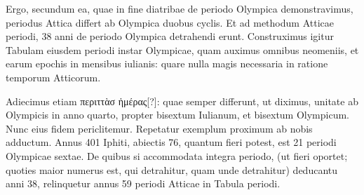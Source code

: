 Ergo, secundum ea, quae in fine diatribae de periodo
Olympica demonstravimus, periodus Attica differt ab Olympica
duobus cyclis.
Et ad methodum Atticae periodi, 38 anni de periodo
Olympica detrahendi erunt.
Construximus igitur Tabulam eiusdem
periodi instar Olympicae, quam auximus omnibus neomeniis,
et earum epochis in mensibus iulianis: quare nulla magis necessaria
in ratione temporum Atticorum.




Adiecimus etiam \textgreek{περιττὰσ ἡμέρας[?]}:
quae semper differunt, ut diximus, unitate ab Olympicis in anno quarto,
propter bisextum Iulianum, et bisextum Olympicum.
Nunc eius
fidem periclitemur.
Repetatur exemplum proximum ab nobis adductum.
Annus 401 Iphiti, abiectis 76, quantum fieri potest, est 21 periodi
Olympicae sextae.
De quibus si accommodata integra periodo,
(ut fieri oportet; quoties maior numerus est, qui detrahitur, quam unde
detrahitur) deducantu anni 38, relinquetur annus 59 periodi
Atticae in Tabula periodi.


